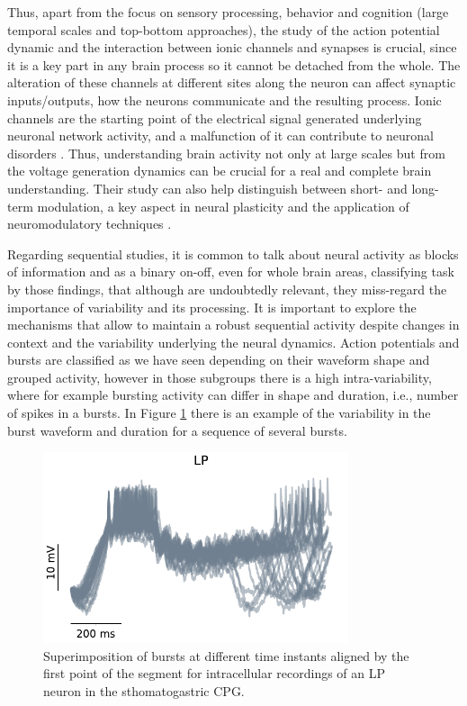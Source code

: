 Thus, apart from the focus on sensory processing, behavior and cognition (large temporal scales and top-bottom approaches), the study of the action potential dynamic and the interaction between ionic channels and synapses is crucial, since it is a key part in any brain process so it cannot be detached from the whole. The alteration of these channels at different sites along the neuron can affect synaptic inputs/outputs, how the neurons communicate and the resulting process. Ionic channels are the starting point of the electrical signal generated underlying neuronal network activity, and a malfunction of it can contribute to neuronal disorders \parencite{kecskes_editorial_2023}. Thus, understanding brain activity not only at large scales but from the voltage generation dynamics can be crucial for a real and complete brain understanding. Their study can also help distinguish between short- and long-term modulation, a key aspect in neural plasticity and the application of neuromodulatory techniques \parencite{chambers_light-activated_2008,kenneth_modulation_2019}.

Regarding sequential studies, it is common to talk about neural activity as blocks of information and as a binary on-off, even for whole brain areas, classifying task by those findings, that although are undoubtedly relevant, they miss-regard the importance of variability and its processing. 
It is important to explore the mechanisms that allow to maintain a robust sequential activity despite changes in context and the variability underlying the neural dynamics. Action potentials and bursts are classified as we have seen depending on their waveform shape and grouped activity, however in those subgroups there is a high intra-variability, where for example bursting activity can differ in shape and duration, i.e., number of spikes in a bursts. In Figure \ref{fig:burst variability} there is an example of the variability in the burst waveform and duration for a sequence of several bursts. 


\begin{figure}[htb!]
	\centering
	\includegraphics[width=0.8\textwidth]{img/intro/burst_variability.pdf}
	\caption{Superimposition of bursts at different time instants aligned by the first point of the segment for intracellular recordings of an LP neuron in the sthomatogastric CPG.}
	\label{fig:burst variability}
\end{figure}


